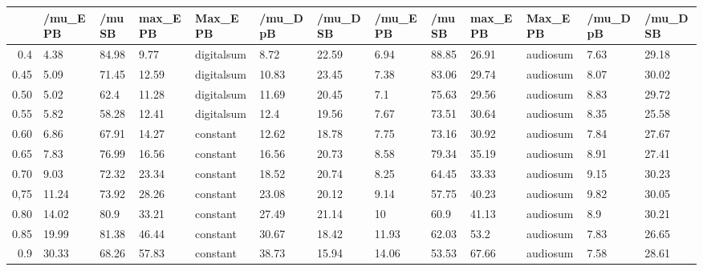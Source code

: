 \begin{table}[ht]
\centering
\begin{tabular}{rllllllllllll}
  \hline
 & /mu\_E PB & /mu SB & max\_E PB & Max\_E PB & /mu\_D pB & /mu\_D SB & /mu\_E PB & /mu SB & max\_E PB & Max\_E PB & /mu\_D pB & /mu\_D SB \\ 
  \hline
0.4 & 4.38 & 84.98 & 9.77 & digitalsum & 8.72 & 22.59 & 6.94 & 88.85 & 26.91 & audiosum & 7.63 & 29.18 \\ 
  0.45 & 5.09 & 71.45 & 12.59 & digitalsum & 10.83 & 23.45 & 7.38 & 83.06 & 29.74 & audiosum & 8.07 & 30.02 \\ 
  0.50 & 5.02 & 62.4 & 11.28 & digitalsum & 11.69 & 20.45 & 7.1 & 75.63 & 29.56 & audiosum & 8.83 & 29.72 \\ 
  0.55 & 5.82 & 58.28 & 12.41 & digitalsum & 12.4 & 19.56 & 7.67 & 73.51 & 30.64 & audiosum & 8.35 & 25.58 \\ 
  0.60 & 6.86 & 67.91 & 14.27 & constant & 12.62 & 18.78 & 7.75 & 73.16 & 30.92 & audiosum & 7.84 & 27.67 \\ 
  0.65 & 7.83 & 76.99 & 16.56 & constant & 16.56 & 20.73 & 8.58 & 79.34 & 35.19 & audiosum & 8.91 & 27.41 \\ 
  0.70 & 9.03 & 72.32 & 23.34 & constant & 18.52 & 20.74 & 8.25 & 64.45 & 33.33 & audiosum & 9.15 & 30.23 \\ 
  0,75 & 11.24 & 73.92 & 28.26 & constant & 23.08 & 20.12 & 9.14 & 57.75 & 40.23 & audiosum & 9.82 & 30.05 \\ 
  0.80 & 14.02 & 80.9 & 33.21 & constant & 27.49 & 21.14 & 10 & 60.9 & 41.13 & audiosum & 8.9 & 30.21 \\ 
  0.85 & 19.99 & 81.38 & 46.44 & constant & 30.67 & 18.42 & 11.93 & 62.03 & 53.2 & audiosum & 7.83 & 26.65 \\ 
  0.9 & 30.33 & 68.26 & 57.83 & constant & 38.73 & 15.94 & 14.06 & 53.53 & 67.66 & audiosum & 7.58 & 28.61 \\ 
   \hline
\end{tabular}
\end{table}
